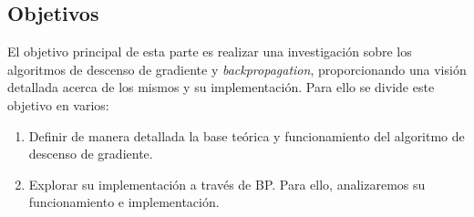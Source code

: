 \subsection{Objetivos}

El objetivo principal de esta parte es realizar una investigación sobre los algoritmos de descenso de gradiente y \textit{backpropagation}, proporcionando una visión detallada acerca de los mismos y su implementación. Para ello se divide este objetivo en varios:

\begin{enumerate}
    
    \item Definir de manera detallada la base teórica y funcionamiento del algoritmo de descenso de gradiente.

    \item Explorar su implementación a través de BP. Para ello, analizaremos su funcionamiento e implementación.


\end{enumerate}



